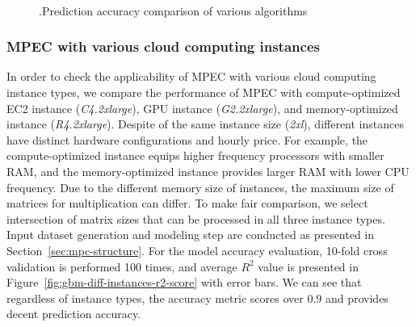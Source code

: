 \documentclass[10pt, conference, compsocconf]{IEEEtran}
\begin{document}
\begin{figure}[t]
  \centering
  \\
   \hfil {}
  \caption{\label{fig:algorithm-comparison}.Prediction accuracy comparison of various algorithms}
\end{figure}

\subsubsection{MPEC with various cloud computing instances}
In order to check the applicability of MPEC with various cloud computing instance types, we compare the performance of MPEC with compute-optimized EC2 instance (\textit{C4.2xlarge}), GPU instance (\textit{G2.2xlarge}), and memory-optimized instance (\textit{R4.2xlarge}). Despite of the same instance size (\textit{2xl}), different instances have distinct hardware configurations and hourly price. For example, the compute-optimized instance equips higher frequency processors with smaller RAM, and the memory-optimized instance provides larger RAM with lower CPU frequency. Due to the different memory size of instances, the maximum size of matrices for multiplication can differ. To make fair comparison, we select intersection of matrix sizes that can be processed in all three instance types. Input dataset generation and modeling step are conducted as presented in Section~\ref{sec:mpc-structure}. For the model accuracy evaluation, 10-fold cross validation is performed 100 times, and average $R^2$ value is presented in Figure~\ref{fig:gbm-diff-instances-r2-score} with error bars. We can see that regardless of instance types, the accuracy metric scores over $0.9$ and provides decent prediction accuracy.
\end{document}
